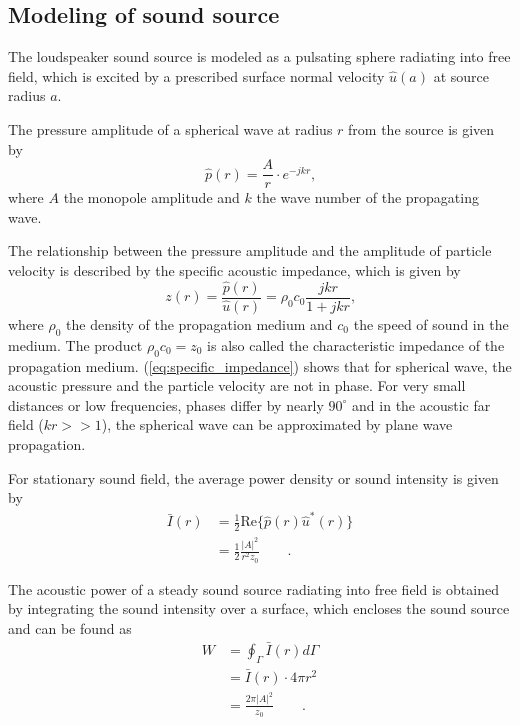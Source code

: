 \subsection*{Modeling of sound source}

The loudspeaker sound source is modeled as a pulsating sphere radiating into free field, which is excited by a prescribed surface normal velocity $\hat{u}(a)$ at source radius $a$.

The pressure amplitude of a spherical wave at radius $r$ from the source is given by
\begin{equation}
	\hat{p}(r) = \frac{A}{r}\cdot e^{-jkr}\text{,}
\end{equation}
where $A$ the monopole amplitude and $k$ the wave number of the propagating wave.

The relationship between the pressure amplitude and the amplitude of particle velocity is described by the specific acoustic impedance, which is given by
\begin{equation}
	z(r) = \frac{\hat{p}(r)}{\hat{u}(r)} = \rho_0 c_0\frac{jkr}{1+jkr}\text{,} \label{eq:specific_impedance}
\end{equation}
where $\rho_0$ the density of the propagation medium and $c_0$ the speed of sound in the medium. The product $\rho_0 c_0 = z_0$ is also called the characteristic impedance of the propagation medium. (\ref{eq:specific_impedance}) shows that for spherical wave, the acoustic pressure and the particle velocity are not in phase. For very small distances or low frequencies, phases differ by nearly $90^{\circ}$ and in the acoustic far field ($kr >> 1$), the spherical wave can be approximated by plane wave propagation.

For stationary sound field, the average power density or sound intensity is given by
\begin{align}
	\bar{I}(r) &= \frac{1}{2}\text{Re}\lbrace\hat{p}(r)\hat{u}^*(r)\rbrace \\
	&=\frac{1}{2}\frac{|A|^2}{r^2z_0}\qquad \text{.}
\end{align}

The acoustic power of a steady sound source radiating into free field is obtained by integrating the sound intensity over a surface, which encloses the sound source and can be found as
\begin{align}
	W &= \oint_{\Gamma} \bar{I}(r) d\Gamma \\
	  &= \bar{I}(r)\cdot 4\pi r^2 \\
	  &= \frac{2\pi |A|^2}{z_0} \qquad \text{.} \label{eq:acoustic_power}
\end{align}

